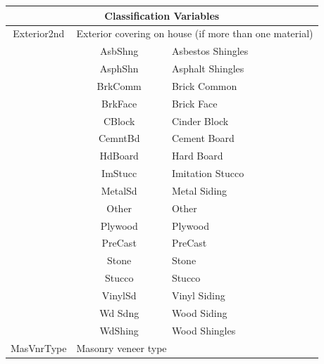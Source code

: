 \documentclass[11pt]{scrartcl} %
\begin{document}
\begin{center}
\begin{tabular}{c c c c c c}
\hline
\multicolumn{6}{|c|}{Classification Variables}\\
\hline
\multicolumn{2}{|c}{Exterior2nd} & \multicolumn{4}{l|}{Exterior covering on house (if more than one material)}\\ 
\multicolumn{2}{|c}{} & \multicolumn{1}{c}{AsbShng} & \multicolumn{3}{l|}{Asbestos Shingles}\\
\multicolumn{2}{|c}{} & \multicolumn{1}{c}{AsphShn} & \multicolumn{3}{l|}{Asphalt Shingles}\\
\multicolumn{2}{|c}{} & \multicolumn{1}{c}{BrkComm} & \multicolumn{3}{l|}{Brick Common}\\
\multicolumn{2}{|c}{} & \multicolumn{1}{c}{BrkFace} & \multicolumn{3}{l|}{Brick Face}\\
\multicolumn{2}{|c}{} & \multicolumn{1}{c}{CBlock} & \multicolumn{3}{l|}{Cinder Block}\\
\multicolumn{2}{|c}{} & \multicolumn{1}{c}{CemntBd} & \multicolumn{3}{l|}{Cement Board}\\
\multicolumn{2}{|c}{} & \multicolumn{1}{c}{HdBoard} & \multicolumn{3}{l|}{Hard Board}\\
\multicolumn{2}{|c}{} & \multicolumn{1}{c}{ImStucc} & \multicolumn{3}{l|}{Imitation Stucco}\\
\multicolumn{2}{|c}{} & \multicolumn{1}{c}{MetalSd} & \multicolumn{3}{l|}{Metal Siding}\\
\multicolumn{2}{|c}{} & \multicolumn{1}{c}{Other} & \multicolumn{3}{l|}{Other}\\
\multicolumn{2}{|c}{} & \multicolumn{1}{c}{Plywood} & \multicolumn{3}{l|}{Plywood}\\
\multicolumn{2}{|c}{} & \multicolumn{1}{c}{PreCast} & \multicolumn{3}{l|}{PreCast}\\
\multicolumn{2}{|c}{} & \multicolumn{1}{c}{Stone	} & \multicolumn{3}{l|}{Stone}\\
\multicolumn{2}{|c}{} & \multicolumn{1}{c}{Stucco} & \multicolumn{3}{l|}{Stucco}\\
\multicolumn{2}{|c}{} & \multicolumn{1}{c}{VinylSd} & \multicolumn{3}{l|}{Vinyl Siding}\\
\multicolumn{2}{|c}{} & \multicolumn{1}{c}{Wd Sdng} & \multicolumn{3}{l|}{Wood Siding}\\
\multicolumn{2}{|c}{} & \multicolumn{1}{c}{WdShing} & \multicolumn{3}{l|}{Wood Shingles}\\
\hline
\multicolumn{2}{|c}{MasVnrType} & \multicolumn{4}{l|}{Masonry veneer type}\\ 

\end{tabular}
\end{center}
\end{document}
